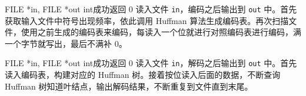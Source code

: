 {FILE *in, FILE *out}
{int}{成功返回 0}
{读入文件 {\tt in}，编码之后输出到 {\tt out} 中。首先获取输入文件中符号出现频率，依此调用 Huffman 算法生成编码表。再次扫描文件，使用之前生成的编码表来编码，每读入一个位就进行对照编码表进行编码，满一个字节就写出，最后不满补 0。}


{FILE *in, FILE *out}
{int}{成功返回 0}
{读入文件 {\tt in}，解码之后输出到 {\tt out} 中。首先读入编码表，构建对应的 Huffman 树。接着按位读入后面的数据，不断查询 Huffman 树知道叶结点，输出解码结果，不断重复到文件直到末尾。}
